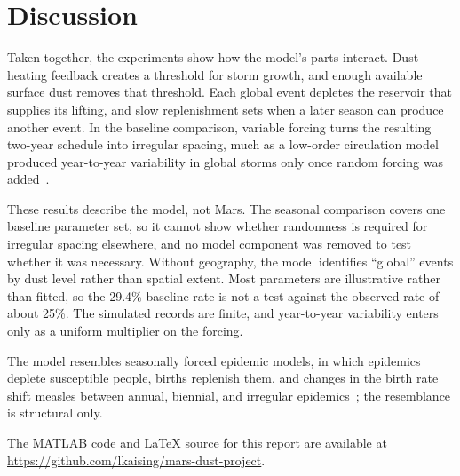 \section{Discussion}
\label{sec:discussion}

Taken together, the experiments show how the model's parts interact. Dust-heating feedback creates a threshold for storm growth, and enough available surface dust removes that threshold. Each global event depletes the reservoir that supplies its lifting, and slow replenishment sets when a later season can produce another event. In the baseline comparison, variable forcing turns the resulting two-year schedule into irregular spacing, much as a low-order circulation model produced year-to-year variability in global storms only once random forcing was added~\cite{pankine2002}.

These results describe the model, not Mars. The seasonal comparison covers one baseline parameter set, so it cannot show whether randomness is required for irregular spacing elsewhere, and no model component was removed to test whether it was necessary. Without geography, the model identifies ``global'' events by dust level rather than spatial extent. Most parameters are illustrative rather than fitted, so the 29.4\% baseline rate is not a test against the observed rate of about 25\%. The simulated records are finite, and year-to-year variability enters only as a uniform multiplier on the forcing.

The model resembles seasonally forced epidemic models, in which epidemics deplete susceptible people, births replenish them, and changes in the birth rate shift measles between annual, biennial, and irregular epidemics~\cite{earn2000}; the resemblance is structural only.

The MATLAB code and LaTeX source for this report are available at
\url{https://github.com/lkaising/mars-dust-project}.
